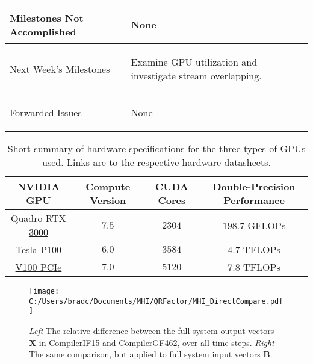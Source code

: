 \documentclass[11pt,letterpaper]{article}
\begin{document}
\begin{tabular}{| p{} | p{} |}
	Milestones Not \newline Accomplished & \begin{enumerate*}
	\item[\tiny\textbullet] None
	\end{enumerate*} \\ \hline

	Next Week's \newline Milestones & \begin{enumerate*}
    \item[\tiny\textbullet] Examine GPU utilization and investigate stream overlapping.
	\end{enumerate*} \\ \hline

	Forwarded Issues & \begin{enumerate*}
	\item[\tiny\textbullet] None
	\end{enumerate*} \\ \hline
\end{tabular}


\begin{table}[b]
    \begin{tabular}{| c | c | c | c |}
        \hline
        {\bf NVIDIA GPU} & {\bf Compute Version} & {\bf CUDA Cores} & {\bf Double-Precision Performance} \\ \hline
        \href{https://www.nvidia.com/content/dam/en-zz/Solutions/design-visualization/documents/quadro-mobile-line-card-n18-11x8.5-r4-hr.pdf}{Quadro RTX 3000} & $7.5$ & $2304$ & $198.7$ GFLOPs \\ \hline
        \href{https://images.nvidia.com/content/tesla/pdf/nvidia-tesla-p100-PCIe-datasheet.pdf}{Tesla P100} & $6.0$ & $3584$ & $4.7$ TFLOPs \\ \hline
        \href{https://images.nvidia.com/content/technologies/volta/pdf/volta-v100-datasheet-update-us-1165301-r5.pdf}{V100 PCIe} & $7.0$ & $5120$ & $7.8$ TFLOPs \\ \hline
    \end{tabular}
    \caption{Short summary of hardware specifications for the three types of GPUs used. Links are to the 
    respective hardware datasheets.}
    \label{t:gpu_stats}
\end{table}


\begin{figure}[!ht]
    \centering
    \texttt{[image: C:/Users/bradc/Documents/MHI/QRFactor/MHI\_DirectCompare.pdf]}
    \caption{\emph{Left} The relative difference between the full system output vectors $\mathbf{X}$ in 
    CompilerIF15 and CompilerGF462, over all time steps. \emph{Right} The same comparison, but applied 
    to full system input vectors $\mathbf{B}$.}
    \label{f:mhi_compare}
\end{figure}
\end{document}
